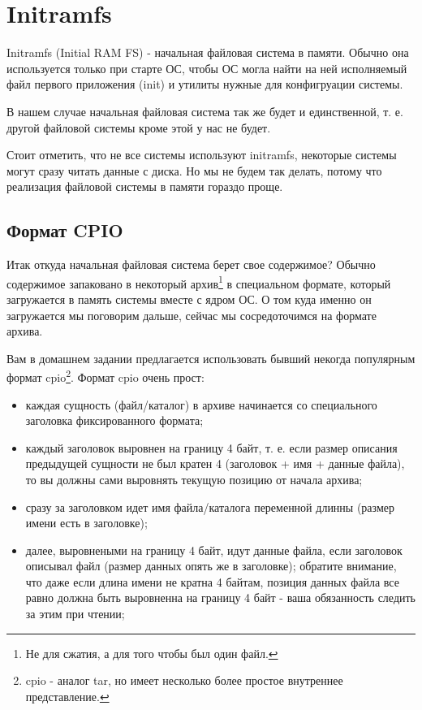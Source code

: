 \section{Initramfs}

Initramfs (Initial RAM FS) - начальная файловая система в памяти. Обычно она
используется только при старте ОС, чтобы ОС могла найти на ней исполняемый
файл первого приложения (init) и утилиты нужные для конфигруации системы.

В нашем случае начальная файловая система так же будет и единственной, т. е.
другой файловой системы кроме этой у нас не будет.

Стоит отметить, что не все системы используют initramfs, некоторые системы
могут сразу читать данные с диска. Но мы не будем так делать, потому что
реализация файловой системы в памяти гораздо проще.

\subsection{Формат CPIO}

Итак откуда начальная файловая система берет свое содержимое? Обычно
содержимое запаковано в некоторый архив\footnote{Не для сжатия, а для того
чтобы был один файл.} в специальном формате, который загружается в память
системы вместе с ядром ОС. О том куда именно он загружается мы поговорим дальше,
сейчас мы сосредоточимся на формате архива.

Вам в домашнем задании предлагается использовать бывший некогда популярным
формат cpio\footnote{cpio - аналог tar, но имеет несколько более простое
внутреннее представление.}. Формат cpio очень прост:
\begin{itemize}
  \item каждая сущность (файл/каталог) в архиве начинается со специального
        заголовка фиксированного формата;
  \item каждый заголовок выровнен на границу 4 байт, т. е. если размер
        описания предыдущей сущности не был кратен 4 (заголовок + имя + данные
        файла), то вы должны сами выровнять текущую позицию от начала архива;
  \item сразу за заголовком идет имя файла/каталога переменной длинны (размер
        имени есть в заголовке);
  \item далее, выровнеными на границу 4 байт, идут данные файла, если заголовок
        описывал файл (размер данных опять же в заголовке); обратите внимание,
        что даже если длина имени не кратна 4 байтам, позиция данных файла все
        равно должна быть выровненна на границу 4 байт - ваша обязанность следить
        за этим при чтении;
\end{itemize}

